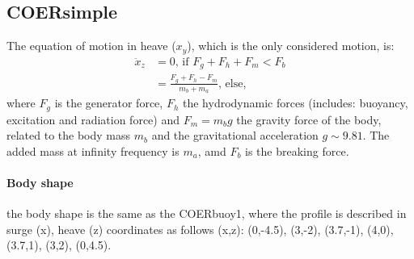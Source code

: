 \documentclass[oneside,10pt,a4paper]{book}
\begin{document}
\subsection{COERsimple}
The equation of motion in heave ($x_y$), which is the only considered motion, is:
\begin{align}\label{eq:COERsimple}
\ddot{x}_z&=0\text{, if }F_g+F_h+F_m<F_b \\
	&=\frac{F_g+F_h-F_m}{m_b+m_a}\text{, else,} 
\end{align}
where $F_g$ is the generator force, $F_h$ the hydrodynamic forces (includes: buoyancy, excitation and radiation force) and $F_m=m_b g$ the gravity force of the body, related to the body mass $m_b$ and the gravitational acceleration $g\sim9.81$. The added mass at infinity frequency is $m_a$, amd $F_b$ is the breaking force.
\paragraph{Body shape}
the body shape is the same as the COERbuoy1, where the profile is described in surge (x), heave (z) coordinates as follows (x,z): (0,-4.5), (3,-2), (3.7,-1), (4,0), (3.7,1), (3,2), (0,4.5).
 
 
\end{document}
